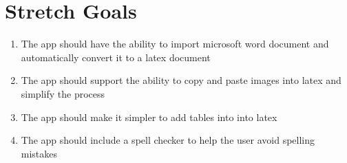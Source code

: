 \documentclass{article}
\begin{document}
\section{Stretch Goals}

\begin{enumerate}
	\item The app should have the ability to import microsoft word document and automatically convert it to a latex document
	\item The app should support the ability to copy and paste images into latex and simplify the process
	\item The app should make it simpler to add tables into into latex
	\item The app should include a spell checker to help the user avoid spelling mistakes
\end{enumerate}
\end{document}
